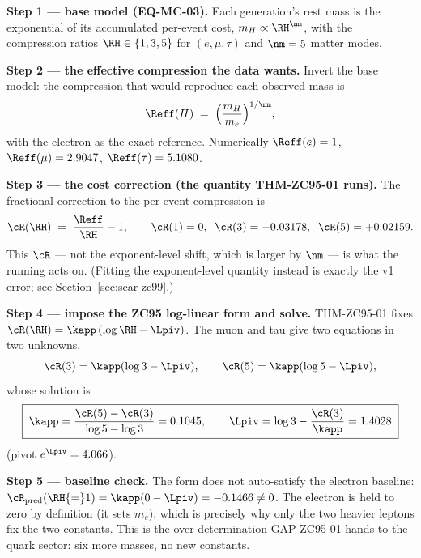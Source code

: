 \documentclass[12pt, a4paper]{article}
\begin{document}
\begin{formalbox}[title={The Five-Step Extraction of $(\kapp,\Lpiv)$ from
  Lepton Pole Masses}]
\textbf{Step 1 --- base model (EQ-MC-03).} Each generation's rest mass is the
exponential of its accumulated per-event cost, $m_H\propto\RH^{\nm}$, with the
compression ratios $\RH\in\{1,3,5\}$ for $(e,\mu,\tau)$ and $\nm=5$ matter modes.

\textbf{Step 2 --- the effective compression the data wants.} Invert the base
model: the compression that would reproduce each observed mass is
\[
  \Reff(H) \;=\; \Big(\frac{m_H}{m_e}\Big)^{1/\nm},
\]
with the electron as the exact reference. Numerically
$\Reff(e)=1$, $\Reff(\mu)=2.9047$, $\Reff(\tau)=5.1080$.

\textbf{Step 3 --- the cost correction (the quantity THM-ZC95-01 runs).} The
fractional correction to the per-event compression is
\[
  \cR(\RH)\;=\;\frac{\Reff}{\RH}-1,
  \qquad
  \cR(1)=0,\;\; \cR(3)=-0.03178,\;\; \cR(5)=+0.02159 .
\]
This $\cR$ --- not the exponent-level shift, which is larger by $\nm$ --- is
what the running acts on. (Fitting the exponent-level quantity instead is
exactly the v1 error; see Section~\ref{sec:scar-zc99}.)

\textbf{Step 4 --- impose the ZC95 log-linear form and solve.} THM-ZC95-01 fixes
$\cR(\RH)=\kapp\,(\log\RH-\Lpiv)$. The muon and tau give two equations in two
unknowns,
\[
  \cR(3)=\kapp(\log 3-\Lpiv), \qquad \cR(5)=\kapp(\log 5-\Lpiv),
\]
whose solution is
\[
  \boxed{\;\kapp=\dfrac{\cR(5)-\cR(3)}{\log 5-\log 3}=0.1045,
   \qquad
   \Lpiv=\log 3-\dfrac{\cR(3)}{\kapp}=1.4028\;}
\]
(pivot $e^{\Lpiv}=4.066$).

\textbf{Step 5 --- baseline check.} The form does not auto-satisfy the electron
baseline: $\cR_{\text{pred}}(\RH{=}1)=\kapp(0-\Lpiv)=-0.1466\neq0$. The electron
is held to zero by definition (it sets $m_e$), which is precisely why only the
two heavier leptons fix the two constants. This is the over-determination
GAP-ZC95-01 hands to the quark sector: six more masses, no new constants.
\end{formalbox}

\end{document}
